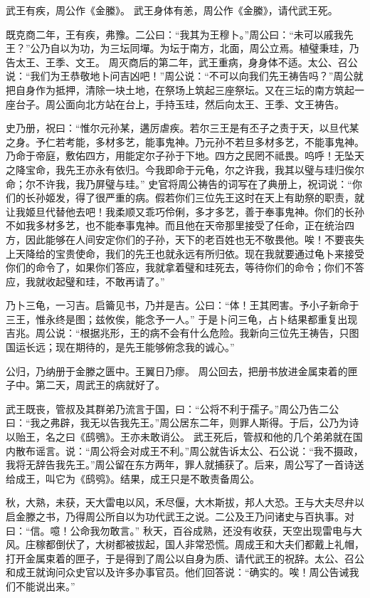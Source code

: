 \documentclass[a4paper,12pt,UTF8,twoside]{ctexbook}
\begin{document}
武王有疾，周公作《金縢》。
武王身体有恙，周公作《金縢》，请代武王死。

既克商二年，王有疾，弗豫。二公曰：“我其为王穆卜。”周公曰：“未可以戚我先王？”公乃自以为功，为三坛同墠。为坛于南方，北面，周公立焉。植璧秉珪，乃告太王、王季、文王。
周灭商后的第二年，武王重病，身身体不适。太公、召公说：“我们为王恭敬地卜问吉凶吧！”周公说：“不可以向我们先王祷告吗？”周公就把自身作为抵押，清除一块土地，在祭场上筑起三座祭坛。又在三坛的南方筑起一座台子。周公面向北方站在台上，手持玉珪，然后向太王、王季、文王祷告。

史乃册，祝曰：“惟尔元孙某，遘厉虐疾。若尔三王是有丕子之责于天，以旦代某之身。予仁若考能，多材多艺，能事鬼神。乃元孙不若旦多材多艺，不能事鬼神。乃命于帝庭，敷佑四方，用能定尔子孙于下地。四方之民罔不祗畏。呜呼！无坠天之降宝命，我先王亦永有依归。今我即命于元龟，尔之许我，我其以璧与珪归俟尔命；尔不许我，我乃屏璧与珪。”
史官将周公祷告的词写在了典册上，祝词说：“你们的长孙姬发，得了很严重的病。假若你们三位先王这时在天上有助祭的职责，就让我姬旦代替他去吧！我柔顺又乖巧伶俐，多才多艺，善于奉事鬼神。你们的长孙不如我多材多艺，也不能奉事鬼神。而且他在天帝那里接受了任命，正在统治四方，因此能够在人间安定你们的子孙，天下的老百姓也无不敬畏他。唉！不要丧失上天降给的宝贵使命，我们的先王也就永远有所归依。现在我就要通过龟卜来接受你们的命令了，如果你们答应，我就拿着璧和珪死去，等待你们的命令；你们不答应，我就收起璧和珪，不敢再请了。”

乃卜三龟，一习吉。启籥见书，乃并是吉。公曰：“体！王其罔害。予小子新命于三王，惟永终是图；兹攸俟，能念予一人。”
于是卜问三龟，占卜结果都重复出现吉兆。周公说：“根据兆形，王的病不会有什么危险。我新向三位先王祷告，只图国运长远；现在期待的，是先王能够俯念我的诚心。”

公归，乃纳册于金滕之匮中。王翼日乃瘳。
周公回去，把册书放进金属束着的匣子中。第二天，周武王的病就好了。

武王既丧，管叔及其群弟乃流言于国，曰：“公将不利于孺子。”周公乃告二公曰：“我之弗辟，我无以告我先王。”周公居东二年，则罪人斯得。于后，公乃为诗以贻王，名之曰《鸱鴞》。王亦未敢诮公。
武王死后，管叔和他的几个弟弟就在国内散布谣言。说：“周公将会对成王不利。”周公就告诉太公、石公说：“我不摄政，我将无辞告我先王。”周公留在东方两年，罪人就捕获了。后来，周公写了一首诗送给成王，叫它为《鸱鸮》。结果，成王只是不敢责备周公。

秋，大熟，未获，天大雷电以风，禾尽偃，大木斯拔，邦人大恐。王与大夫尽弁以启金滕之书，乃得周公所自以为功代武王之说。二公及王乃问诸史与百执事。对曰：“信。噫！公命我勿敢言。”
秋天，百谷成熟，还没有收获，天空出现雷电与大风。庄稼都倒伏了，大树都被拔起，国人非常恐慌。周成王和大夫们都戴上礼帽，打开金属束着的匣子，于是得到了周公以自身为质、请代武王的祝辞。太公、召公和成王就询问众史官以及许多办事官员。他们回答说：“确实的。唉！周公告诫我们不能说出来。”
\end{document}
